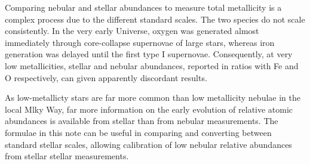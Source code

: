 Comparing nebular and stellar abundances to measure total metallicity is a complex process due to the different standard scales.  The two species do not scale consistently.  In the very early Universe, oxygen was generated almost immediately through core-collapse supernovae of large stars, whereas iron generation was delayed until the first type I supernovae. Consequently, at very low metallicities, stellar and nebular abundances, reported in ratios with Fe and O respectively, can given apparently discordant results. 

As low-metallicty stars are far more common than low metallicity nebulae in the local Mlky Way, far more information on the early evolution of relative atomic abundances is available from stellar than from nebular measurements. The formulae in this note can be useful in comparing and converting between standard stellar scales, allowing calibration of low nebular relative abundances from stellar stellar measurements.

  
  
  
  
  
  
  
  
  
  
  
  
  
  
  
  
  
  
  
  
  
  
  
  
  
  
  
  
